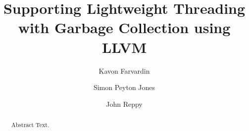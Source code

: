 \documentclass[sigplan, anonymous, review, nonacm]{acmart}
\begin{document}
\title{Supporting Lightweight Threading with Garbage Collection using LLVM}

\author{Kavon Farvardin}

\author{Simon Peyton Jones}

\author{John Reppy}



\begin{abstract}
Abstract Text.
\end{abstract}



\maketitle



% 
% 
\end{document}
